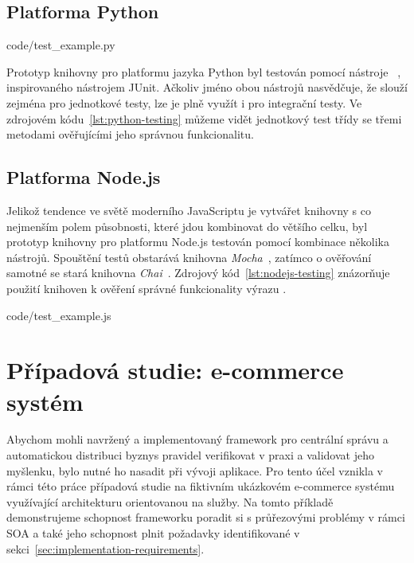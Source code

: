 \subsection{Platforma Python}


{code/test_example.py}

Prototyp knihovny pro platformu jazyka Python byl testován pomocí
nástroje ~\cite{pythonunittest}, inspirovaného nástrojem
JUnit. Ačkoliv jméno obou nástrojů nasvědčuje, že slouží zejména pro jednotkové testy,
lze je plně využít i pro integrační testy. Ve zdrojovém kódu~\ref{lst:python-testing} můžeme
vidět jednotkový test třídy  se třemi metodami ověřujícími jeho
správnou funkcionalitu.


\subsection{Platforma Node.js}

Jelikož tendence ve světě moderního JavaScriptu je vytvářet knihovny s co nejmenším polem působnosti,
které jdou kombinovat do většího celku, byl prototyp knihovny pro platformu Node.js testován pomocí
kombinace několika nástrojů. Spouštění testů obstarává knihovna \textit{Mocha}~\cite{mocha}, zatímco
o ověřování samotné se stará knihovna \textit{Chai}~\cite{chai}. Zdrojový kód~\ref{lst:nodejs-testing}
znázorňuje použití knihoven k ověření správné funkcionality výrazu .



{code/test_example.js}

\section{Případová studie: e-commerce systém}

Abychom mohli navržený a implementovaný framework pro centrální správu
a automatickou distribuci byznys pravidel verifikovat v praxi a validovat
jeho myšlenku, bylo nutné ho nasadit při vývoji aplikace.
Pro tento účel vznikla v rámci této práce případová studie na fiktivním
ukázkovém e-commerce systému využívající architekturu orientovanou na služby.
Na tomto příkladě demonstrujeme schopnost frameworku poradit si s průřezovými
problémy v rámci SOA a také jeho schopnost plnit požadavky identifikované v
sekci~\ref{sec:implementation-requirements}.

